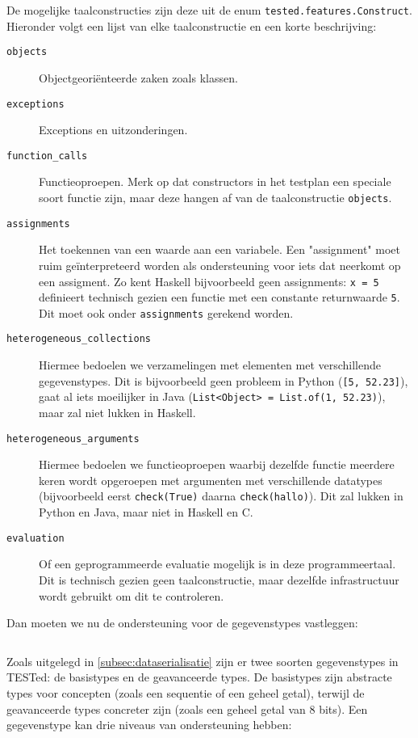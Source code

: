 De mogelijke taalconstructies zijn deze uit de enum \texttt{tested.features.Construct}.
Hieronder volgt een lijst van elke taalconstructie en een korte beschrijving:

\begin{description}
    \item[\texttt{objects}] Objectgeoriënteerde zaken zoals klassen.
    \item[\texttt{exceptions}] Exceptions en uitzonderingen.
    \item[\texttt{function\_calls}] Functieoproepen.
    Merk op dat constructors in het testplan een speciale soort functie zijn, maar deze hangen af van de taalconstructie \texttt{objects}.
    \item[\texttt{assignments}] Het toekennen van een waarde aan een variabele.
    Een "assignment" moet ruim geïnterpreteerd worden als ondersteuning voor iets dat neerkomt op een assigment.
    Zo kent Haskell bijvoorbeeld geen assignments: \texttt{x = 5} definieert technisch gezien een functie met een constante returnwaarde \texttt{5}.
    Dit moet ook onder \texttt{assignments} gerekend worden.
    \item[\texttt{heterogeneous\_collections}] Hiermee bedoelen we verzamelingen met elementen met verschillende gegevenstypes.
    Dit is bijvoorbeeld geen probleem in Python (\texttt{[5, 52.23]}), gaat al iets moeilijker in Java (\texttt{List<Object> = List.of(1, 52.23)}), maar zal niet lukken in Haskell.
    \item[\texttt{heterogeneous\_arguments}] Hiermee bedoelen we functieoproepen waarbij dezelfde functie meerdere keren wordt opgeroepen met argumenten met verschillende datatypes (bijvoorbeeld eerst \texttt{check(True)} daarna \texttt{check(\textquotesingle{}hallo\textquotesingle{})}).
    Dit zal lukken in Python en Java, maar niet in Haskell en C\@.
    \item[\texttt{evaluation}] Of een geprogrammeerde evaluatie mogelijk is in deze programmeertaal.
    Dit is technisch gezien geen taalconstructie, maar dezelfde infrastructuur wordt gebruikt om dit te controleren.
\end{description}

Dan moeten we nu de ondersteuning voor de gegevenstypes vastleggen:

\inputminted[firstline=28,lastline=54,gobble=2]{js}{sources/c-config.json}

Zoals uitgelegd in \cref{subsec:dataserialisatie} zijn er twee soorten gegevenstypes in TESTed: de basistypes en de geavanceerde types.
De basistypes zijn abstracte types voor concepten (zoals een sequentie of een geheel getal), terwijl de geavanceerde types concreter zijn (zoals een geheel getal van 8 bits).
Een gegevenstype kan drie niveaus van ondersteuning hebben:

